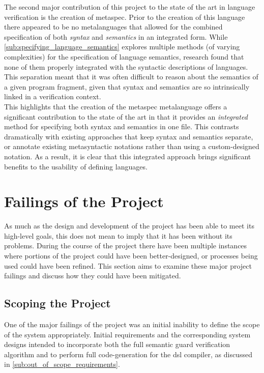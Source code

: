 The second major contribution of this project to the state of the art in language verification is the creation of \gls{metaspec}. 
Prior to the creation of this language there appeared to be no metalanguages that allowed for the combined specification of both \textit{syntax} and \textit{semantics} in an integrated form. 
While \autoref{sub:specifying_language_semantics} explores multiple methods (of varying complexities) for the specification of language semantics, research found that none of them properly integrated with the syntactic descriptions of languages.
This separation meant that it was often difficult to reason about the semantics of a given program fragment, given that syntax and semantics are so intrinsically linked in a verification context.\\

This highlights that the creation of the \gls{metaspec} metalanguage offers a significant contribution to the state of the art in that it provides an \textit{integrated} method for specifying both syntax and semantics in one file.
This contrasts dramatically with existing approaches that keep syntax and semantics separate, or annotate existing metasyntactic notations rather than using a custom-designed notation.
As a result, it is clear that this integrated approach brings significant benefits to the usability of defining languages.



\section{Failings of the Project} %
\label{sec:failings_of_the_project}

As much as the design and development of the project has been able to meet its high-level goals, this does not mean to imply that it has been without its problems. 
During the course of the project there have been multiple instances where portions of the project could have been better-designed, or processes being used could have been refined. 
This section aims to examine these major project failings and discuss how they could have been mitigated. 

\subsection{Scoping the Project} %
\label{sub:scoping_the_project}
One of the major failings of the project was an initial inability to define the scope of the system appropriately.
Initial requirements and the corresponding system designs intended to incorporate both the full semantic guard verification algorithm and to perform full code-generation for the \gls{dsl} compiler, as discussed in \autoref{sub:out_of_scope_requirements}. \\

